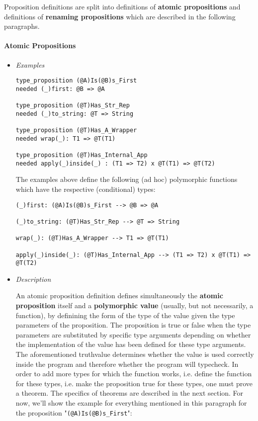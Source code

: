 \documentclass{article}
\begin{document}
Proposition definitions are split into definitions of \textbf{atomic
propositions} and definitions of \textbf{renaming propositions} which are
described in the following paragraphs.

\paragraph{Atomic Propositions}

\begin{itemize}
\item \textit{Examples}
\begin{verbatim}
type_proposition (@A)Is(@B)s_First
needed (_)first: @B => @A

type_proposition (@T)Has_Str_Rep
needed (_)to_string: @T => String

type_proposition (@T)Has_A_Wrapper
needed wrap(_): T1 => @T(T1)

type_proposition (@T)Has_Internal_App
needed apply(_)inside(_) : (T1 => T2) x @T(T1) => @T(T2)
\end{verbatim}
The examples above define the following (ad hoc) polymorphic functions which
have the respective (conditional) types:
\begin{verbatim}
(_)first: (@A)Is(@B)s_First --> @B => @A

(_)to_string: (@T)Has_Str_Rep --> @T => String

wrap(_): (@T)Has_A_Wrapper --> T1 => @T(T1)

apply(_)inside(_): (@T)Has_Internal_App --> (T1 => T2) x @T(T1) => @T(T2)
\end{verbatim}

\newpage

\item \textit{Description}

An atomic proposition definition defines simultaneously the \textbf{atomic
proposition} itself and a \textbf{polymorphic value} (usually, but not
necessarily, a function), by definining the form of the type of the value given
the type parameters of the proposition. The proposition is true or false when
the type parameters are substituted by specific type arguments depending on
whether the implementation of the value has been defined for these type
arguments. The aforementioned truthvalue determines whether the value is used
correctly inside the program and therefore whether the program will typecheck.
In order to add more types for which the function works, i.e.  define the
function for these types, i.e. make the proposition true for these types, one
must prove a theorem. The specifics of theorems are described in the next
section. For now, we'll show the example for everything mentioned in this
paragraph for the proposition "\verb|(@A)Is(@B)s_First|":


\end{itemize}
\end{document}
